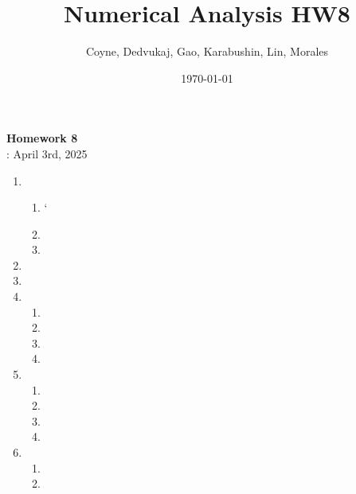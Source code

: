 \documentclass[12pt]{article}
\title{Numerical Analysis HW8}
\author{Coyne, Dedvukaj, Gao, Karabushin, Lin, Morales}
\date{\today}
\begin{document}
\pagestyle{fancy}


\begin{center}
\textbf{\Large Homework 8} \\
: April 3rd, 2025
\end{center}

\begin{enumerate}[leftmargin=0em]
  \item
  \begin{enumerate}[leftmargin=!]
    \item`

    \item

    \item
  \end{enumerate}

  \item
  
  \item
  
  \item
  \begin{enumerate}[leftmargin=!]
    \item

    \item

    \item

    \item
  \end{enumerate}


  \item
  \begin{enumerate}[leftmargin=!]
    \item

    \item

    \item

    \item
  \end{enumerate}

  \item
  \begin{enumerate}[leftmargin=!]
    \item

    \item
  \end{enumerate}
\end{enumerate}
\end{document}
